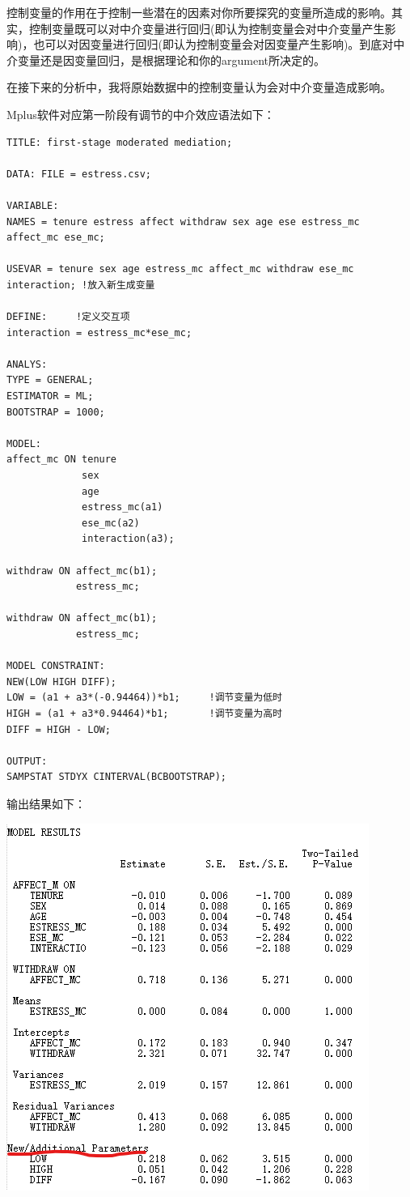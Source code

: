 \documentclass[
]{book}
\begin{document}
控制变量的作用在于控制一些潜在的因素对你所要探究的变量所造成的影响。其实，控制变量既可以对中介变量进行回归(即认为控制变量会对中介变量产生影响)，也可以对因变量进行回归(即认为控制变量会对因变量产生影响)。到底对中介变量还是因变量回归，是根据理论和你的argument所决定的。

在接下来的分析中，我将原始数据中的控制变量认为会对中介变量造成影响。

Mplus软件对应第一阶段有调节的中介效应语法如下：

\begin{verbatim}
TITLE: first-stage moderated mediation;

DATA: FILE = estress.csv;

VARIABLE:
NAMES = tenure estress affect withdraw sex age ese estress_mc affect_mc ese_mc;

USEVAR = tenure sex age estress_mc affect_mc withdraw ese_mc interaction; !放入新生成变量

DEFINE:     !定义交互项
interaction = estress_mc*ese_mc; 

ANALYS:
TYPE = GENERAL;
ESTIMATOR = ML;
BOOTSTRAP = 1000;

MODEL:
affect_mc ON tenure
             sex
             age
             estress_mc(a1)
             ese_mc(a2)
             interaction(a3);

withdraw ON affect_mc(b1);
            estress_mc;

withdraw ON affect_mc(b1);
            estress_mc;

MODEL CONSTRAINT:
NEW(LOW HIGH DIFF);
LOW = (a1 + a3*(-0.94464))*b1;     !调节变量为低时
HIGH = (a1 + a3*0.94464)*b1;       !调节变量为高时
DIFF = HIGH - LOW;

OUTPUT:
SAMPSTAT STDYX CINTERVAL(BCBOOTSTRAP);
\end{verbatim}

输出结果如下：

\includegraphics{figs/1143.png}
\end{document}
